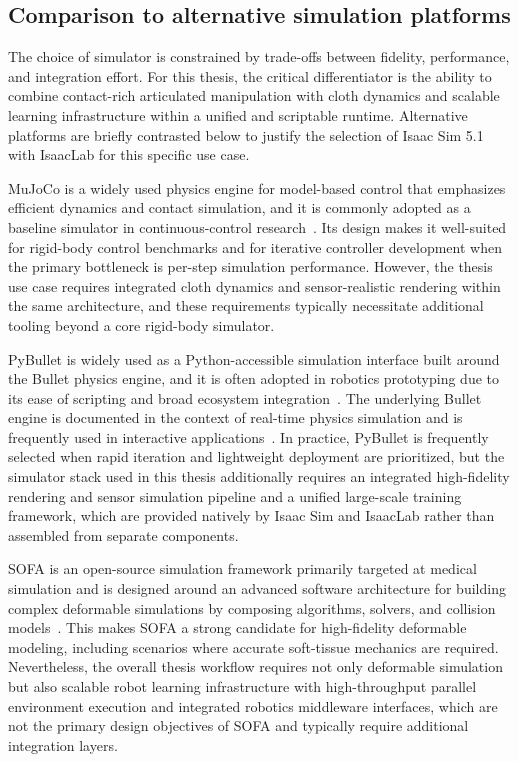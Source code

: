 \subsection{Comparison to alternative simulation platforms}
The choice of simulator is constrained by trade-offs between fidelity, performance, and integration effort. For this thesis, the critical differentiator is the ability to combine contact-rich articulated manipulation with cloth dynamics and scalable learning infrastructure within a unified and scriptable runtime. Alternative platforms are briefly contrasted below to justify the selection of Isaac Sim 5.1 with IsaacLab for this specific use case.

MuJoCo is a widely used physics engine for model-based control that emphasizes efficient dynamics and contact simulation, and it is commonly adopted as a baseline simulator in continuous-control research~\cite{Todorov2012MuJoCo}. Its design makes it well-suited for rigid-body control benchmarks and for iterative controller development when the primary bottleneck is per-step simulation performance. However, the thesis use case requires integrated cloth dynamics and sensor-realistic rendering within the same architecture, and these requirements typically necessitate additional tooling beyond a core rigid-body simulator. %

PyBullet is widely used as a Python-accessible simulation interface built around the Bullet physics engine, and it is often adopted in robotics prototyping due to its ease of scripting and broad ecosystem integration~\cite{pybullet_homepage}. The underlying Bullet engine is documented in the context of real-time physics simulation and is frequently used in interactive applications~\cite{Coumans2015Bullet}. In practice, PyBullet is frequently selected when rapid iteration and lightweight deployment are prioritized, but the simulator stack used in this thesis additionally requires an integrated high-fidelity rendering and sensor simulation pipeline and a unified large-scale training framework, which are provided natively by Isaac Sim and IsaacLab rather than assembled from separate components.

SOFA is an open-source simulation framework primarily targeted at medical simulation and is designed around an advanced software architecture for building complex deformable simulations by composing algorithms, solvers, and collision models~\cite{Allard2007SOFA}. This makes SOFA a strong candidate for high-fidelity deformable modeling, including scenarios where accurate soft-tissue mechanics are required. Nevertheless, the overall thesis workflow requires not only deformable simulation but also scalable robot learning infrastructure with high-throughput parallel environment execution and integrated robotics middleware interfaces, which are not the primary design objectives of SOFA and typically require additional integration layers. %


